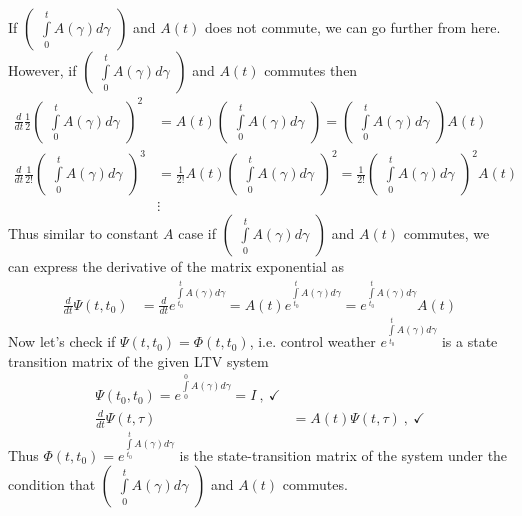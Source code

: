 \documentclass[twoside]{article}
\begin{document}
%
If $\begin{pmatrix} \int\limits_{0}^{t} A(\gamma) d\gamma \end{pmatrix}$ and $A(t)$ does not commute, we can go further from here. However, if $\begin{pmatrix} \int\limits_{0}^{t} A(\gamma) d\gamma \end{pmatrix}$ and $A(t)$ commutes then 
%
\begin{align*}
\frac{d}{dt} \frac{1}{2} \begin{pmatrix} \int\limits_{0}^{t} A(\gamma) d\gamma \end{pmatrix}^2 &=  A(t) \begin{pmatrix} \int\limits_{0}^{t} A(\gamma) d\gamma \end{pmatrix} 
= \begin{pmatrix} \int\limits_{0}^{t} A(\gamma) d\gamma \end{pmatrix} A(t) 
\\
\frac{d}{dt} \frac{1}{2 !} \begin{pmatrix} \int\limits_{0}^{t} A(\gamma) d\gamma \end{pmatrix}^3 &= \frac{1}{2 !}  A(t) \begin{pmatrix} \int\limits_{0}^{t} A(\gamma) d\gamma \end{pmatrix}^2
= \frac{1}{2 !} \begin{pmatrix} \int\limits_{0}^{t} A(\gamma) d\gamma \end{pmatrix}^2 A(t) 
\\
&\vdots
\end{align*}
%
Thus similar to constant $A$ case if $\begin{pmatrix} \int\limits_{0}^{t} A(\gamma) d\gamma \end{pmatrix}$ and $A(t)$ commutes, we can express the derivative of the matrix exponential as
%
\begin{align*}
\frac{d}{dt} \Psi(t,t_0) &= \frac{d}{dt} e^{ \int\limits_{t_0}^{t} A(\gamma) d\gamma }  = A(t) e^{ \int\limits_{t_0}^{t} A(\gamma) d\gamma } = e^{ \int\limits_{t_0}^{t} A(\gamma) d\gamma } A(t)
\end{align*}
% 
Now let's check if $\Psi(t,t_0) = \Phi(t,t_0)$, i.e. control weather $e^{ \int\limits_{t_0}^{t} A(\gamma) d\gamma }$ is a state transition matrix of the given LTV system
%
\begin{align*}
\Psi(t_0,t_0) = e^{ \int\limits_{0}^{0} A(\gamma) d\gamma } = I \ , \ \checkmark
\\
\frac{d}{dt} \Psi(t,\tau) &= A(t) \Psi(t,\tau) \ , \ \checkmark
\end{align*}
%
Thus $\Phi(t,t_0)  = e^{ \int\limits_{t_0}^{t} A(\gamma) d\gamma }$ is the state-transition matrix of the system under the condition that 
$\begin{pmatrix} \int\limits_{0}^{t} A(\gamma) d\gamma \end{pmatrix}$ and $A(t)$ commutes.
\end{document}
